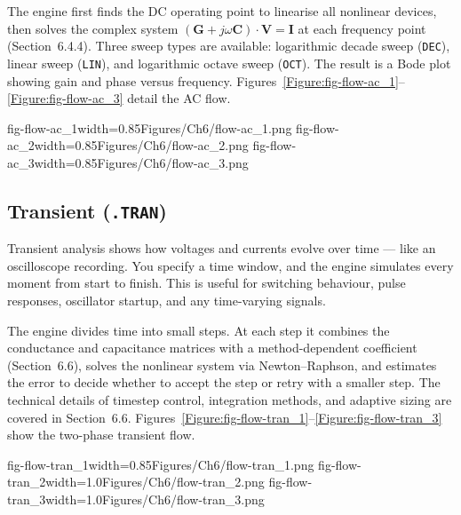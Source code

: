 The engine first finds the DC operating point to linearise all nonlinear devices, then solves the complex system $(\mathbf{G} + j\omega\mathbf{C}) \cdot \mathbf{V} = \mathbf{I}$ at each frequency point (Section~6.4.4). Three sweep types are available: logarithmic decade sweep (\texttt{DEC}), linear sweep (\texttt{LIN}), and logarithmic octave sweep (\texttt{OCT}). The result is a Bode plot showing gain and phase versus frequency. Figures~\ref{Figure:fig-flow-ac_1}--\ref{Figure:fig-flow-ac_3} detail the AC flow.

  {fig-flow-ac_1}{width=0.85\textwidth}{Figures/Ch6/flow-ac_1.png}
  {fig-flow-ac_2}{width=0.85\textwidth}{Figures/Ch6/flow-ac_2.png}
  {fig-flow-ac_3}{width=0.85\textwidth}{Figures/Ch6/flow-ac_3.png}

\subsection{Transient (\texttt{.TRAN})}

Transient analysis shows how voltages and currents evolve over time --- like an oscilloscope recording. You specify a time window, and the engine simulates every moment from start to finish. This is useful for switching behaviour, pulse responses, oscillator startup, and any time-varying signals.

The engine divides time into small steps. At each step it combines the conductance and capacitance matrices with a method-dependent coefficient (Section~6.6), solves the nonlinear system via Newton--Raphson, and estimates the error to decide whether to accept the step or retry with a smaller step. The technical details of timestep control, integration methods, and adaptive sizing are covered in Section~6.6. Figures~\ref{Figure:fig-flow-tran_1}--\ref{Figure:fig-flow-tran_3} show the two-phase transient flow.

  {fig-flow-tran_1}{width=0.85\textwidth}{Figures/Ch6/flow-tran_1.png}
  {fig-flow-tran_2}{width=1.0\textwidth}{Figures/Ch6/flow-tran_2.png}
  {fig-flow-tran_3}{width=1.0\textwidth}{Figures/Ch6/flow-tran_3.png}

